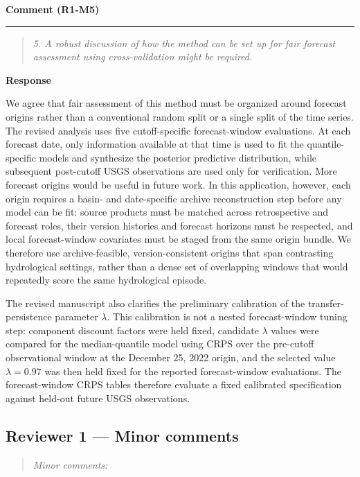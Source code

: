 \documentclass[11pt,letterpaper]{article}
\newcommand{\commentheading}[1]{%
  \vspace{6pt}\noindent\textbf{Comment (#1)}\par
  \vspace{2pt}\hrule\vspace{6pt}
}
\newenvironment{commentblock}{\begin{quote}\small\itshape}{\end{quote}}
\newcommand{\responseheading}{%
  \vspace{2pt}\noindent\textbf{Response}\par
}
\newenvironment{responsebox}{\begin{mdframed}[style=plainbox]}{\end{mdframed}}
\newcommand{\RoneM}[1]{R1-M#1}
\begin{document}
\commentheading{\RoneM{5}}
\begin{commentblock}
5. A robust discussion of how the method can be set up for fair forecast assessment using cross-validation might be required.
\end{commentblock}
\responseheading
\begin{responsebox}
We agree that fair assessment of this method must be organized around forecast origins rather than a conventional random split or a single split of the time series. The revised analysis uses five cutoff-specific forecast-window evaluations. At each forecast date, only information available at that time is used to fit the quantile-specific models and synthesize the posterior predictive distribution, while subsequent post-cutoff USGS observations are used only for verification. More forecast origins would be useful in future work. In this application, however, each origin requires a basin- and date-specific archive reconstruction step before any model can be fit: source products must be matched across retrospective and forecast roles, their version histories and forecast horizons must be respected, and local forecast-window covariates must be staged from the same origin bundle. We therefore use archive-feasible, version-consistent origins that span contrasting hydrological settings, rather than a dense set of overlapping windows that would repeatedly score the same hydrological episode.

The revised manuscript also clarifies the preliminary calibration of the transfer-persistence parameter \(\lambda\). This calibration is not a nested forecast-window tuning step: component discount factors were held fixed, candidate \(\lambda\) values were compared for the median-quantile model using CRPS over the pre-cutoff observational window at the December 25, 2022 origin, and the selected value \(\lambda=0.97\) was then held fixed for the reported forecast-window evaluations. The forecast-window CRPS tables therefore evaluate a fixed calibrated specification against held-out future USGS observations.
\end{responsebox}

\subsection{Reviewer 1 --- Minor comments }
\begin{commentblock}
Minor comments:
\end{commentblock}
\end{document}
